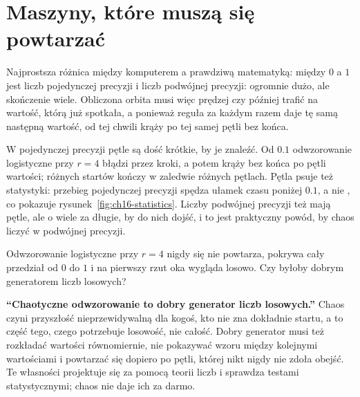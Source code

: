 
\section{Maszyny, które muszą się powtarzać}
\label{sec:ch16-random}

\noindent
Najprostsza różnica między komputerem a prawdziwą matematyką: między $0$ a $1$ jest  liczb pojedynczej precyzji i
 liczb podwójnej precyzji: ogromnie dużo, ale
skończenie wiele. Obliczona orbita musi więc prędzej czy później trafić na
wartość, którą już spotkała, a ponieważ reguła za każdym razem daje tę samą
następną wartość, od tej chwili krąży po tej samej pętli bez końca.

W pojedynczej precyzji pętle są dość krótkie, by je znaleźć. Od $\num{0.1}$
odwzorowanie logistyczne przy $r = 4$ błądzi przez 
kroki, a potem krąży bez końca po pętli  wartości;
 różnych startów kończy w zaledwie
 różnych pętlach. Pętla psuje też statystyki: przebieg
pojedynczej precyzji spędza ułamek  czasu poniżej
$\num{0.1}$, a nie , co pokazuje
rysunek~\ref{fig:ch16-statistics}. Liczby podwójnej precyzji też mają pętle,
ale o wiele za długie, by do nich dojść, i to jest praktyczny powód, by
chaos liczyć w podwójnej precyzji.

\begin{think}
Odwzorowanie logistyczne przy $r = 4$ nigdy się nie powtarza, pokrywa cały
przedział od $0$ do $1$ i na pierwszy rzut oka wygląda losowo. Czy byłoby
dobrym generatorem liczb losowych?
\end{think}

\begin{trapbox}
\textbf{\enquote{Chaotyczne odwzorowanie to dobry generator liczb losowych.}}
Chaos czyni przyszłość nieprzewidywalną dla kogoś, kto nie zna dokładnie
startu, a to część tego, czego potrzebuje losowość, nie całość. Dobry
generator musi też rozkładać wartości równomiernie, nie pokazywać wzoru
między kolejnymi wartościami i powtarzać się dopiero po pętli, której nikt
nigdy nie zdoła obejść. Te własności projektuje się za pomocą teorii liczb i
sprawdza testami statystycznymi; chaos nie daje ich za darmo.
\end{trapbox}

